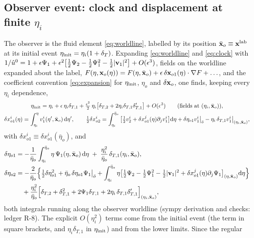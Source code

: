 \subsection{Observer event: clock and displacement at finite \texorpdfstring{$\eta_i$}{eta\_i}}
\label{sec:obsevent}
The observer is the fluid element \eqref{eq:worldline}, labelled by its position $\bar{\mathbf x}_o\equiv\mathbf x^{\rm lab}$ at its initial event
$\eta_{\rm init}=\eta_i(1+\delta_T)$.  Expanding \eqref{eq:worldline} and \eqref{eq:clock} with
$1/\hat u^0=1+\epsilon\Psi_1+\epsilon^2\big[\tfrac12\Psi_2-\tfrac12\Psi_1^2-\tfrac12|\mathbf v_1|^2\big]+O(\epsilon^3)$, fields on the worldline expanded
about the label, $F(\eta,\mathbf x_o(\eta))=F(\eta,\bar{\mathbf x}_o)+\epsilon\,\delta\mathbf x_{o1}(\eta)\cdot\nabla F+\ldots$, and the coefficient convention
\eqref{eq:expansion} for $\eta_{\rm init}$, $\eta_o$ and $\delta\mathbf x_o$, one finds, keeping every $\eta_i$ dependence,
\begin{gather}
\eta_{\rm init}=\eta_i+\epsilon\,\eta_i\delta_{T,1}+\tfrac{\epsilon^2}2\,\eta_i\big[\delta_{T,2}+2\eta_i\delta_{T,1}\delta_{T,1}'\big]+O(\epsilon^3)\qquad\text{(fields at }(\eta_i,\bar{\mathbf x}_o)),\nonumber\\
\delta x^i_{o1}(\eta)=\int_{\eta_i}^{\eta}v^i_1(\eta',\bar{\mathbf x}_o)\,\mathrm d\eta',\qquad
\tfrac12\delta x^i_{o2}=\int_{\eta_i}^{\bar\eta_o}\big[\tfrac12v^i_2+\delta x^j_{o1}(\eta)\partial_jv^i_1\big]\mathrm d\eta+\delta\eta_{o1}v^i_1\big|_{\bar o}
-\eta_i\,\delta_{T,1}v^i_1\big|_{(\eta_i,\bar{\mathbf x}_o)},
\label{eq:dxo}
\end{gather}
with $\delta x^i_{o1}\equiv\delta x^i_{o1}(\bar\eta_o)$, and
\begin{align}
\delta\eta_{o1}&=-\frac1{\bar\eta_o}\int_{\eta_i}^{\bar\eta_o}\eta\,\Psi_1(\eta,\bar{\mathbf x}_o)\,\mathrm d\eta\;+\;\frac{\eta_i^2}{\bar\eta_o}\,\delta_{T,1}(\eta_i,\bar{\mathbf x}_o),\label{eq:deta_o1}\\
\delta\eta_{o2}&=-\frac2{\bar\eta_o}\Big\{\tfrac12\delta\eta_{o1}^2+\bar\eta_o\,\delta\eta_{o1}\Psi_1\big|_{\bar o}
+\int_{\eta_i}^{\bar\eta_o}\eta\big[\tfrac12\Psi_2-\tfrac12\Psi_1^2-\tfrac12|\mathbf v_1|^2+\delta x^j_{o1}(\eta)\partial_j\Psi_1\big]_{(\eta,\bar{\mathbf x}_o)}\mathrm d\eta\Big\}\nonumber\\
&\quad+\frac{\eta_i^2}{\bar\eta_o}\Big[\delta_{T,2}+\delta_{T,1}^2+2\Psi_1\delta_{T,1}+2\eta_i\,\delta_{T,1}\delta_{T,1}'\Big]_{(\eta_i,\bar{\mathbf x}_o)} ,
\label{eq:deta_o2}
\end{align}
both integrals running along the observer worldline (sympy derivation and checks: ledger R-8).  The explicit $O(\eta_i^2)$ terms come
from the initial event (the term in square brackets, and $\eta_i\delta_{T,1}$ in $\eta_{\rm init}$) and from the lower limits.  Since the regular
